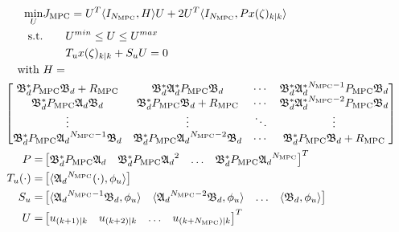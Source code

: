 \begin{equation} \label{eq:3_MPC_QP}
    \begin{aligned}
        \min_{U} &J_{\mathrm{MPC}} = U^T \langle I_{N_{\mathrm{MPC}}},H \rangle U + 2U^T \langle I_{N_{\mathrm{MPC}}}, P x(\zeta)_{k|k} \rangle \\
        \text{s.t.} &\qquad U^{min} \leq U \leq U^{max} \\
        &\qquad T_u {x}(\zeta)_{k|k} + S_u U = 0
        \, \\
        \text{with } &H = \\
        &\hspace{-3.5em }\begin{bmatrix}
            \mathfrak{B}_d^\ast P_{\mathrm{MPC}} \mathfrak{B}_d + {R_{\mathrm{MPC}}} & \mathfrak{B}_d^\ast \mathfrak{A}_d^\ast P_{\mathrm{MPC}} \mathfrak{B}_d & \cdots &  \mathfrak{B}_d^\ast {\mathfrak{A}_d^\ast}^{N_{\mathrm{MPC}}-1} P_{\mathrm{MPC}} \mathfrak{B}_d \\
            \mathfrak{B}_d^\ast P_{\mathrm{MPC}} \mathfrak{A}_d \mathfrak{B}_d & \mathfrak{B}_d^\ast P_{\mathrm{MPC}} \mathfrak{B}_d + {R_{\mathrm{MPC}}} & \cdots & \mathfrak{B}_d^\ast {\mathfrak{A}_d^\ast}^{N_{\mathrm{MPC}}-2} P_{\mathrm{MPC}} \mathfrak{B}_d \\
            \vdots & \vdots & \ddots & \vdots \\
            \mathfrak{B}_d^\ast P_{\mathrm{MPC}} {\mathfrak{A}_d}^{N_{\mathrm{MPC}}-1} \mathfrak{B}_d & \mathfrak{B}_d^\ast P_{\mathrm{MPC}} {\mathfrak{A}_d}^{N_{\mathrm{MPC}}-2} \mathfrak{B}_d & \cdots & \mathfrak{B}_d^\ast P_{\mathrm{MPC}} \mathfrak{B}_d + {R_{\mathrm{MPC}}}
        \end{bmatrix} \\
        P = &\begin{bmatrix}
            \mathfrak{B}_d^\ast P_{\mathrm{MPC}} {\mathfrak{A}_d} &
            \mathfrak{B}_d^\ast P_{\mathrm{MPC}} {\mathfrak{A}_d}^{2}  &
            \hdots & \mathfrak{B}_d^\ast P_{\mathrm{MPC}} {\mathfrak{A}_d}^{N_{\mathrm{MPC}}} 
        \end{bmatrix}^T \\
        T_u (\cdot) = &\begin{bmatrix}
            \langle {\mathfrak{A}_d}^{N_{\mathrm{MPC}}} (\cdot), {\phi_u} \rangle
        \end{bmatrix} \\
        S_u = &\begin{bmatrix}
            \langle {\mathfrak{A}_d}^{N_{\mathrm{MPC}}-1} \mathfrak{B}_d, {\phi_u} \rangle & 
            \langle {\mathfrak{A}_d}^{N_{\mathrm{MPC}}-2} \mathfrak{B}_d, {\phi_u} \rangle &
            \hdots &
            \langle \mathfrak{B}_d, {\phi_u} \rangle
        \end{bmatrix} \\
        U = &\begin{bmatrix}
            u_{(k+1)|k} & u_{(k+2)|k} & \hdots & u_{(k+N_{\mathrm{MPC}})|k}
        \end{bmatrix}^T
    \end{aligned}
\end{equation}

